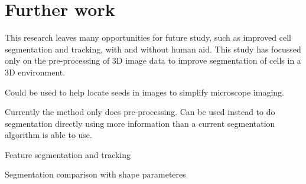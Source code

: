 \section{Further work}

This research leaves many opportunities for future study, such as improved cell segmentation and tracking, with and without human aid. This study has focussed only on the pre-processing of 3D image data to improve segmentation of cells in a 3D environment.

Could be used to help locate seeds in images to simplify microscope imaging.

Currently the method only does pre-processing. Can be used instead to do segmentation directly using more information than a current segmentation algorithm is able to use.

Feature segmentation and tracking

Segmentation comparison with shape parameteres
